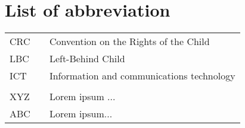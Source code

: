 \section*{List of abbreviation}


\begin{table}[ht]
    \centering
    \begin{tabular}{lll}
        CRC     &&      Convention on the Rights of the Child \\
        LBC     &&      Left-Behind Child \\
        ICT     &&      Information and communications technology \\
                &&              \\
        XYZ     &&      Lorem ipsum ... \\
        ABC     &&      Lorem ipsum...                     
    \end{tabular}
\end{table}